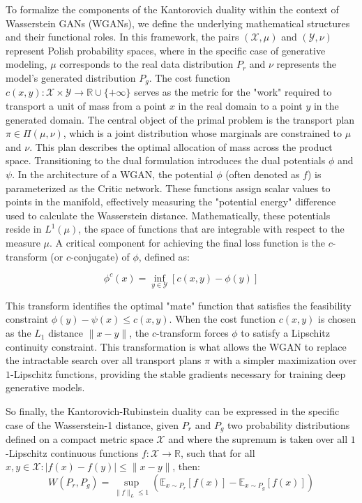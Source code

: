 To formalize the components of the Kantorovich duality
within the context of Wasserstein GANs (WGANs), 
we define the underlying mathematical structures and their functional roles.
In this framework, the pairs $(\mathcal{X}, \mu)$ and $(\mathcal{Y}, \nu)$ 
represent Polish probability spaces, where in the specific case of generative modeling,
$\mu$ corresponds to the real data distribution $P_r$ and $\nu$ represents the model's 
generated distribution $P_g$. The cost function $c(x, y) \colon \mathcal{X} \times \mathcal{Y} \to \mathbb{R} \cup \{+\infty\}$ serves as the metric 
for the "work" required to transport a unit of mass from a point $x$ in the real domain to a point $y$ 
in the generated domain. The central object of the primal problem is the transport plan $\pi \in \Pi(\mu, \nu)$, 
which is a joint distribution whose marginals are constrained to $\mu$ and $\nu$. 
This plan describes the optimal allocation of mass across the product space.
Transitioning to the dual formulation introduces the dual potentials $\phi$ and $\psi$.
In the architecture of a WGAN, the potential $\phi$ (often denoted as $f$) is parameterized as the Critic network.
These functions assign scalar values to points in the manifold, effectively measuring the "potential energy" difference used to calculate the Wasserstein distance. Mathematically,
these potentials reside in $L^1(\mu)$, the space of functions that are integrable with respect 
to the measure $\mu$. A critical component for achieving the final loss function is the $c$-transform (or $c$-conjugate) of $\phi$, defined as:

\begin{equation}
    \phi^c(x) = \inf_{y \in \mathcal{Y}} [c(x, y) - \phi(y)]
\end{equation}

This transform identifies the optimal "mate"
function that satisfies the feasibility constraint
$\phi(y) - \psi(x) \leq c(x, y)$. When the cost function $c(x, y)$
is chosen as the $L_1$ distance $\|x - y\|$, the $c$-transform forces 
$\phi$ to satisfy a Lipschitz continuity constraint. 
This transformation is what allows the WGAN to replace the intractable search over all transport plans $\pi$ with a simpler maximization over $1$-Lipschitz functions, 
providing the stable gradients necessary for training deep generative models.

So finally, the Kantorovich-Rubinstein duality can be expressed in the specific case of the Wasserstein-1 distance, given
$P_r$ and $P_g$ two probability distributions defined on a compact metric space $\mathcal{X}$ and where
the supremum is taken over all $1$-Lipschitz continuous functions $f: \mathcal{X} \to \mathbb{R}$, such that for all $x, y \in \mathcal{X}:   |f(x) - f(y)| \leq \|x - y\|$, then:
\begin{equation}
    \label{eq: emd_dual}
    W(P_r, P_g) = \sup_{\|f\|_L \leq 1} \left( \mathbb{E}_{x \sim P_r}[f(x)] - \mathbb{E}_{x \sim P_g}[f(x)] \right)
\end{equation}


